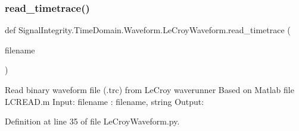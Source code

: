 \subsubsection{\texorpdfstring{read\+\_\+timetrace()}{read\_timetrace()}}
{\footnotesize\ttfamily def Signal\+Integrity.\+Time\+Domain.\+Waveform.\+Le\+Croy\+Waveform.\+read\+\_\+timetrace (\begin{DoxyParamCaption}\item[{}]{filename }\end{DoxyParamCaption})}



Read binary waveform file (.trc) from Le\+Croy waverunner Based on Matlab file L\+C\+R\+E\+A\+D.\+m Input\+: filename \+: filename, string Output\+: 



Definition at line 35 of file Le\+Croy\+Waveform.\+py.

